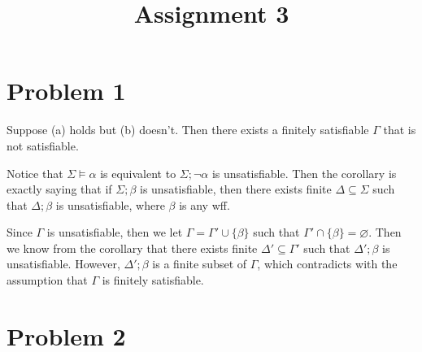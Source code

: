 \documentclass{article}
\title{\huge{\textbf{Assignment 3}}}
\author{\Chi{杨乐天}}
\date{}
\begin{document}
\maketitle

\section*{Problem 1}

Suppose (a) holds but (b) doesn't. Then there exists a finitely satisfiable $\Gamma$ that is not satisfiable.

Notice that $\Sigma \vDash \alpha$ is equivalent to $\Sigma; \neg\alpha$ is unsatisfiable. Then the corollary is exactly saying that if $\Sigma; \beta$ is unsatisfiable, then there exists finite $\Delta \subseteq \Sigma$ such that $\Delta; \beta$ is unsatisfiable, where $\beta$ is any wff.

Since $\Gamma$ is unsatisfiable, then we let $\Gamma = \Gamma' \cup \{ \beta \}$ such that $\Gamma' \cap \{ \beta \} = \varnothing$. Then we know from the corollary that there exists finite $\Delta' \subseteq \Gamma'$ such that $\Delta'; \beta$ is unsatisfiable. However, $\Delta'; \beta$ is a finite subset of $\Gamma$, which contradicts with the assumption that $\Gamma$ is finitely satisfiable.



\section*{Problem 2}

\begin{figure}[htbp]
	\centering
	\hfill
	\hfill
	\\
\end{figure}
\end{document}

